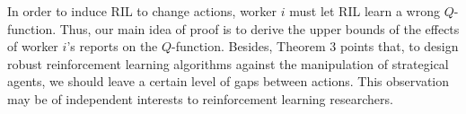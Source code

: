 \documentclass{article}
\begin{document}
In order to induce RIL to change actions, worker $i$ must let RIL learn a wrong $Q$-function. Thus, our main idea of proof is to derive the upper bounds of the effects of worker $i$'s reports on the $Q$-function.
Besides, Theorem 3 points that, to design robust reinforcement learning algorithms against the manipulation of strategical agents, we should leave a certain level of gaps between actions. This observation may be of independent interests to reinforcement learning researchers.


%
%
% 
%
\end{document}
